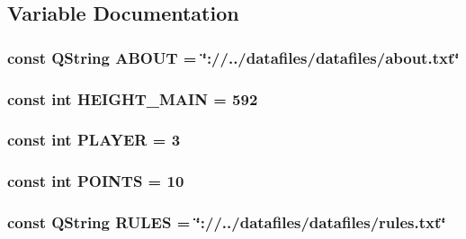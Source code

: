 \subsection{Variable Documentation}
\hypertarget{mainwindow_8hh_add086dddfd1041a943afc24d4fc5217e}{
\subsubsection[{A\-B\-O\-U\-T}]{\setlength{\rightskip}{0pt plus 5cm}const Q\-String A\-B\-O\-U\-T = \char`\"{}\-://../datafiles/datafiles/about.\-txt\char`\"{}}}\label{mainwindow_8hh_add086dddfd1041a943afc24d4fc5217e}
\hypertarget{mainwindow_8hh_a8a9a3d327e245d16d8af8d57ac0428fc}{
\subsubsection[{H\-E\-I\-G\-H\-T\-\_\-\-M\-A\-I\-N}]{\setlength{\rightskip}{0pt plus 5cm}const int H\-E\-I\-G\-H\-T\-\_\-\-M\-A\-I\-N = 592}}\label{mainwindow_8hh_a8a9a3d327e245d16d8af8d57ac0428fc}
\hypertarget{mainwindow_8hh_ad18a55885568d3324c55bdefa31112ba}{
\subsubsection[{P\-L\-A\-Y\-E\-R}]{\setlength{\rightskip}{0pt plus 5cm}const int P\-L\-A\-Y\-E\-R = 3}}\label{mainwindow_8hh_ad18a55885568d3324c55bdefa31112ba}
\hypertarget{mainwindow_8hh_adf877364b47d0f0beade7967f248355c}{
\subsubsection[{P\-O\-I\-N\-T\-S}]{\setlength{\rightskip}{0pt plus 5cm}const int P\-O\-I\-N\-T\-S = 10}}\label{mainwindow_8hh_adf877364b47d0f0beade7967f248355c}
\hypertarget{mainwindow_8hh_afad7eb5ce267412e261321798f276542}{
\subsubsection[{R\-U\-L\-E\-S}]{\setlength{\rightskip}{0pt plus 5cm}const Q\-String R\-U\-L\-E\-S = \char`\"{}\-://../datafiles/datafiles/rules.\-txt\char`\"{}}}\label{mainwindow_8hh_afad7eb5ce267412e261321798f276542}
